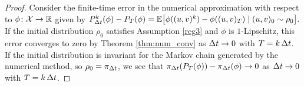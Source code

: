 \documentclass[11pt, twoside]{report}
\begin{document}
\begin{proof}
Consider the finite-time error in the numerical approximation with respect to $\phi\colon \mathcal X\to \mathbb{R}$ given by
$
P_{\tstep}^k(\phi)-P_{T}(\phi)
= \mean{
\phi((u,v)^k)-\phi((u,v)_T) \mid (u,v)_0\sim \rho_0}.
$
If the initial distribution $\rho_0$ satisfies Assumption \ref{reg3} and $\phi$ is $1$-Lipschitz,  this error converges to zero by Theorem \ref{thm:num_conv} as ${\Delta t}\to 0$ with $T=k\,{\Delta t}$. If the initial distribution is invariant for the Markov chain generated by the numerical method, so $\rho_0=\pi_{\Delta t}$, we see that
$\pi_{{\Delta t}}(P_{T}(\phi))-\pi_{\Delta t}(\phi)
\to 0$ as ${\Delta t}\to 0$ with $T=k\,{\Delta t}$.

\end{proof}
\end{document}
